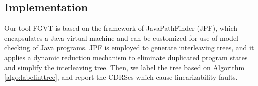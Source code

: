 \documentclass[runningheads]{llncs}
\begin{document}
\subsection{Implementation}
Our tool FGVT is based on the framework of JavaPathFinder (JPF), which encapsulates a Java virtual machine and can be customized for use of model checking of Java programs. JPF is employed to generate interleaving trees, and it applies a dynamic reduction mechanism to eliminate duplicated program states and simplify the interleaving tree. Then, we label the tree based on Algorithm \ref{algo:labelinttree}, and report the CDRSes which cause linearizability faults. %





\end{document}
